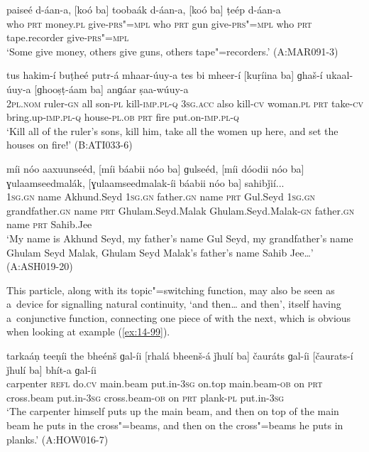 \begin{exe}
\ex
\label{ex:14-96}
\gll [koó ba] paiseé d-áan-a, [koó ba] toobaák  d-áan-a, [koó ba] ṭeép d-áan-a \\
who \textsc{prt} money.\textsc{pl} give-\textsc{prs"=mpl} who \textsc{prt} gun  give-\textsc{prs"=mpl} who \textsc{prt} tape.recorder give-\textsc{prs"=mpl} \\
\glt `Some give money, others give guns, others tape"=recorders.' (A:MAR091-3)

\ex
\label{ex:14-97}
\gll tus hakim-í buṭheé putr-á mhaar-úuy-a tes  bi  mheer-í [kuṛíina ba]
ɡhaš-í ukaal-úuy-a  [ɡhooṣṭ-áam ba] anɡáar ṣaa-wúuy-a \\
\textsc{2pl.nom} ruler-\textsc{gn} all son-\textsc{pl} kill-\textsc{imp.pl-q} \textsc{3sg.acc} also  kill-\textsc{cv} woman.\textsc{pl} \textsc{prt} take-\textsc{cv} bring.up-\textsc{imp.pl-q}  house-\textsc{pl.ob} \textsc{prt} fire put.on-\textsc{imp.pl-q } \\
\glt `Kill all of the ruler's sons, kill him, take all the women up here, and set the houses on fire!' (B:ATI033-6)

\ex
\label{ex:14-98}
\gll míi nóo aaxuunseéd, [míi báabii nóo ba]  ɡulseéd, [míi
  dóodii nóo ba] ɣulaamseedmalák, [ɣulaamseedmalak-íi báabii nóo ba] sahibǰií... \\
\textsc{1sg.gn} name Akhund.Seyd \textsc{1sg.gn} father.\textsc{gn} name \textsc{prt}  Gul.Seyd \textsc{1sg.gn} grandfather.\textsc{gn} name \textsc{prt} Ghulam.Seyd.Malak Ghulam.Seyd.Malak-\textsc{gn} father.\textsc{gn} name \textsc{prt} Sahib.Jee  \\
\glt `My name is Akhund Seyd, my father's name Gul Seyd, my grandfather's name Ghulam Seyd Malak, Ghulam Seyd Malak's father's name Sahib Jee{\ldots}' (A:ASH019-20)
\end{exe}

This particle, along with its topic"=switching function, may also be seen as a~device for signalling natural continuity, `and then{\ldots} and then', itself having a~conjunctive function, connecting one piece of  with the next, which is obvious when looking at example (\ref{ex:14-99}).

\begin{exe}
\ex
\label{ex:14-99}
\gll tarkaáṇ teeṇíi the bheénš ɡal-íi  [rhalá bheenš-á ǰhulí ba] čauráts ɡal-íi  [čaurats-í ǰhulí ba] bhít-a ɡal-íi \\
carpenter \textsc{refl} do.\textsc{cv} main.beam put.in-\textsc{3sg }  on.top main.beam-\textsc{ob} on \textsc{prt} cross.beam put.in-\textsc{3sg}  cross.beam-\textsc{ob} on \textsc{prt} plank-\textsc{pl} put.in-\textsc{3sg} \\
\glt `The carpenter himself puts up the main beam, and then on top of the main beam he puts in the cross"=beams, and then on the cross"=beams he puts in planks.' (A:HOW016-7)
\end{exe}

